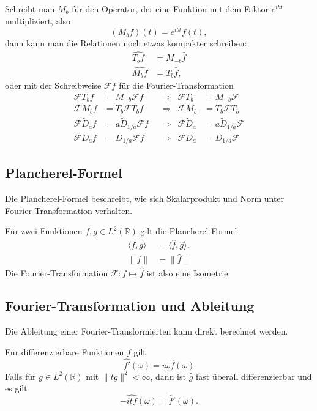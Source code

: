 Schreibt man $M_b$ für den Operator, der eine Funktion mit dem
Faktor $e^{ibt}$ multipliziert, also
\[
(M_bf)(t) = e^{ibt}f(t),
\]
dann kann man die Relationen noch etwas kompakter schreiben:
\begin{align*}
\widehat{T_bf}
&=
M_{-b}\hat{f}
\\
\widehat{M_bf}
&=
T_b\hat{f},
\end{align*}
oder mit der Schreibweise $\mathcal{F}f$ für die Fourier-Transformation
\[
\begin{aligned}
\mathcal{F}T_b f &= M_{-b}\mathcal F f
&&\Rightarrow &
\mathcal{F}T_b &= M_{-b}\mathcal{F}
\\
\mathcal{F}M_b f&=T_b\mathcal{F}T_bf
&&\Rightarrow &
\mathcal{F}M_b&=T_b\mathcal{F}T_b
\\
\mathcal{F}\tilde{D}_af&=a \tilde{D}_{1/a} \mathcal F f
&&\Rightarrow &
\mathcal{F}\tilde{D}_a&=a \tilde{D}_{1/a} \mathcal F 
\\
\mathcal{F}D_af&=D_{1/a} \mathcal F f
&&\Rightarrow &
\mathcal{F}D_a&= D_{1/a} \mathcal F 
\end{aligned}
\]

\subsection{Plancherel-Formel}
%
Die Plancherel-Formel beschreibt, wie sich Skalarprodukt und Norm
unter Fourier-Transformation verhalten.

\begin{satz}
Für zwei Funktionen $f,g\in L^2(\mathbb R)$ gilt die Plancherel-Formel
\begin{align*}
\langle f,g\rangle
&=
\langle \hat{f},\hat{g}\rangle.
\\
\|f\|&=\|\hat{f}\|
\end{align*}
Die Fourier-Transformation $\mathcal{F}\colon f\mapsto \hat{f}$ ist
also eine Isometrie.
\end{satz}

\subsection{Fourier-Transformation und Ableitung
\label{subsection:ft-ableitung}}
Die Ableitung einer Fourier-Transformierten kann direkt berechnet werden.

\begin{satz}
Für differenzierbare Funktionen $f$ gilt
\[
\widehat{f'}(\omega) = i\omega \hat{f}(\omega)
\]
Falls für $g\in L^2(\mathbb R)$ mit $\|tg\|^2<\infty$, dann ist $\hat{g}$
fast überall differenzierbar und es gilt
\[
-\widehat{i t f}(\omega) = \hat{f}'(\omega).
\]
\end{satz}

